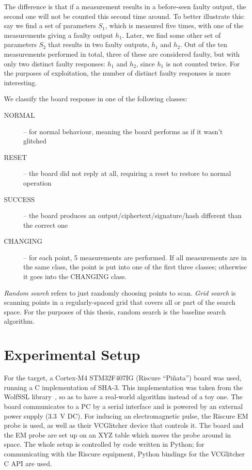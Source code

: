 \documentclass[times, utf8, diplomski]{fer}
\begin{document}
The difference is that if a measurement results in a before-seen faulty output,
the second one will not be counted this second time around.
To better illustrate this: say we find a set of parameters $S_1$, which is
measured five times, with one of the measurements giving a faulty output $h_1$.
Later, we find some other set of parameters $S_2$ that results in two faulty
outputs, $h_1$ and $h_2$. Out of the ten measurements performed in total, three
of these are considered faulty, but with only two distinct faulty responses:
$h_1$ and $h_2$, since $h_1$ is not counted twice.
For the purposes of exploitation, the number of distinct faulty responses is
more interesting.

We classify the board response in one of the following classes:
\begin{description}
    \item[NORMAL]   -- for normal behaviour, meaning the board performs as if it wasn't glitched
    \item[RESET]    -- the board did not reply at all, requiring a reset to restore to normal operation
    \item[SUCCESS]  -- the board produces an output/ciphertext/signature/hash different than the correct one
    \item[CHANGING] -- for each point, 5 measurements are performed. If all measurements are in the
                       same class, the point is put into one of the first three classes; otherwise
                       it goes into the CHANGING class.
\end{description}

\emph{Random search} refers to just randomly choosing points to scan.
\emph{Grid search} is scanning points in a regularly-spaced grid that covers all
or part of the search space.
For the purposes of this thesis, random search is the baseline search algorithm.


\section{Experimental Setup}\label{sec:setup}
For the target, a Cortex-M4 STM32F407IG (Riscure ``Pi\~{n}ata'') board was used,
running a C implementation of SHA-3. This implementation was taken from the WolfSSL
library~\cite{WolfSSL}, so as to have a real-world algorithm instead of a toy one.
The board communicates to a PC by a serial interface and is powered by an external
power supply (\SI{3.3}{\volt} DC). For inducing an electromagnetic pulse, the
Riscure EM probe is used, as well as their VCGlitcher device that controls it.
The board and the EM probe are set up on an XYZ table which moves the probe
around in space. The whole setup is controlled by code written in Python; for
communicating with the Riscure equipment, Python bindings for the VCGlitcher
C API are used.\footnotemark
\end{document}
